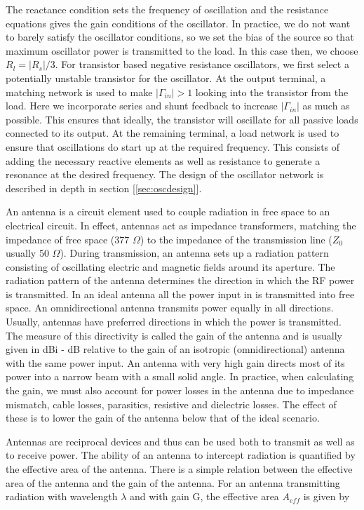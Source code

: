 \documentclass{article}
\begin{document}
The reactance condition sets the frequency of oscillation and the resistance equations gives the gain conditions of the oscillator. In practice, we do not want to barely satisfy the oscillator conditions, so we set the bias of the source so that maximum oscillator power is transmitted to the load. In this case then, we choose $R_l = |R_s|/3$. For transistor based negative resistance oscillators, we first select a potentially unstable transistor for the oscillator. At the output terminal, a matching network is used to make $|\Gamma_{in}| > 1$ looking into the transistor from the load. Here we incorporate series and shunt feedback to increase $|\Gamma_{in}|$ as much as possible. This ensures that ideally, the transistor will oscillate for all passive loads connected to its output. At the remaining terminal, a load network is used to ensure that oscillations do start up at the required frequency. This consists of adding the necessary reactive elements as well as resistance to generate a resonance at the desired frequency. The design of the oscillator network is described in depth in section [\ref{sec:oscdesign}].

An antenna is a circuit element used to couple radiation in free space to an electrical circuit. In effect, antennas act as impedance transformers, matching the impedance of free space (377 $\Omega$) to the impedance of the transmission line ($Z_0$ usually 50 $\Omega$). During transmission, an antenna sets up a radiation pattern consisting of oscillating electric and magnetic fields around its aperture. The radiation pattern of the antenna determines the direction in which the RF power is transmitted. In an ideal antenna all the power input in is transmitted into free space. An omnidirectional antenna transmits power equally in all directions. Usually, antennas have preferred directions in which the power is transmitted. The measure of this directivity is called the gain of the antenna and is usually given in dBi - dB relative to the gain of an isotropic (omnidirectional) antenna with the same power input. An antenna with very high gain directs most of its power into a narrow beam with a small solid angle. In practice, when calculating the gain, we must also account for power losses in the antenna due to impedance mismatch, cable losses, parasitics, resistive and dielectric losses. The effect of these is to lower the gain of the antenna below that of the ideal scenario. 

Antennas are reciprocal devices and thus can be used both to transmit as well as to receive power. The ability of an antenna to intercept radiation is quantified by the effective area of the antenna. There is a simple relation between the effective area of the antenna and the gain of the antenna. For an antenna transmitting radiation with wavelength $\lambda$ and with gain G, the effective area $A_{eff}$ is given by
\end{document}

